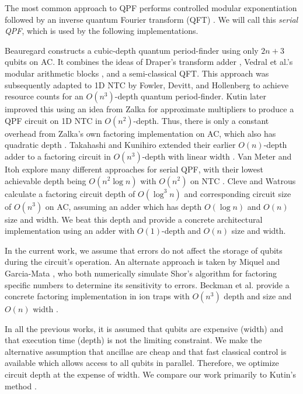 \documentclass[twoside]{article}
\begin{document}
The most common approach to QPF performs controlled
modular exponentiation followed by an inverse quantum Fourier transform
(QFT) \cite{Nielsen2000}. We will call this \emph{serial QPF}, which is
used by the following implementations.

Beauregard \cite{Beauregard2002}
constructs a cubic-depth quantum period-finder using only $2n+3$ qubits on
\textsc{AC}.
It combines the ideas of Draper's transform adder \cite{Draper2000},
Vedral et al.'s modular arithmetic blocks \cite{Vedral1996}, and a
semi-classical QFT.
This approach was subsequently adapted to \textsc{1D NTC} by Fowler, Devitt,
and Hollenberg
\cite{Fowler2004} to achieve resource counts for an $O(n^3)$-depth
quantum period-finder. Kutin \cite{Kutin2006} later improved this using
an idea from Zalka for approximate multipliers to produce a QPF circuit on
\textsc{1D NTC}
in $O(n^2)$-depth. Thus, there is only a constant overhead from
Zalka's own factoring implementation on \textsc{AC}, which also has
quadratic depth \cite{Zalka1998}.
Takahashi and Kunihiro extended their earlier $O(n)$-depth adder to a factoring
circuit in $O(n^3)$-depth with linear width \cite{Takahashi2006}.
Van Meter and Itoh explore many different approaches for serial QPF,
with their lowest achievable depth being $O(n^2\log n)$ with
$O(n^2)$ on \textsc{NTC} \cite{VanMeter2005}. Cleve and Watrous
calculate a factoring circuit depth of $O(\log^3 n)$ and corresponding
circuit size of $O(n^3)$ on \textsc{AC},
assuming an adder which has depth $O(\log n)$ and
$O(n)$ size and width. We beat this depth and provide a concrete
architectural implementation using an adder with $O(1)$-depth and $O(n)$
size and width.

In the current work, we assume that errors do not affect the storage of qubits
during the circuit's operation. An alternate approach is taken by
Miquel \cite{Miquel1996} and Garcia-Mata \cite{GarciaMata2007}, who both
numerically simulate Shor's algorithm for factoring specific
numbers to determine its sensitivity to errors. Beckman et al. provide a
concrete factoring implementation in ion traps with $O(n^3)$ depth and size and
$O(n)$ width \cite{Beckman1996}.

In all the previous works,
it is assumed that qubits are expensive (width) and that
execution time (depth) is not the limiting constraint.
We make the alternative assumption that ancillae are cheap and that fast classical control
is available which allows access to all qubits in parallel.
Therefore, we optimize circuit depth at the expense of width.
We compare our work primarily to Kutin's method \cite{Kutin2006}.
\end{document}
